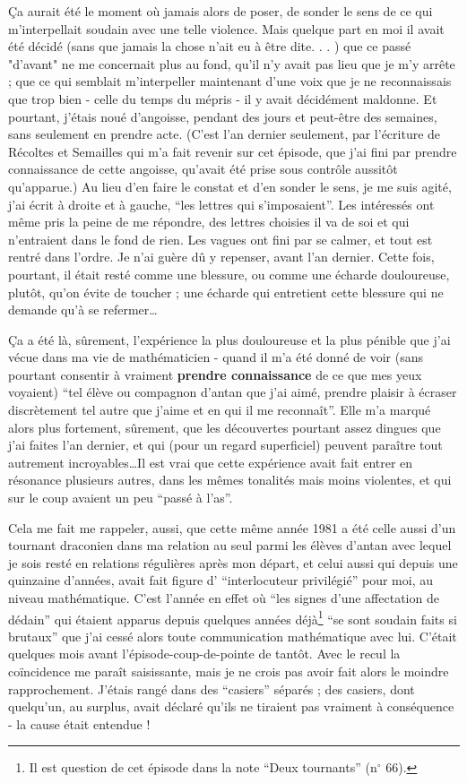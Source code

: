 Ça aurait été le moment où jamais alors de poser, de sonder le sens de ce qui m'interpellait soudain avec une telle violence. Mais quelque part en moi il avait été décidé (sans que jamais la chose n'ait eu à être dite. . . ) que ce passé "d'avant" ne me concernait plus au fond, qu'il n'y avait pas lieu que je m'y arrête ; que ce qui semblait m'interpeller maintenant d'une voix que je ne reconnaissais que trop bien - celle du temps du mépris - il y avait décidément maldonne. Et pourtant, j'étais noué d'angoisse, pendant des jours et peut-être des semaines, sans seulement en prendre acte. (C'est l'an dernier seulement, par l'écriture de Récoltes et Semailles qui m'a fait revenir sur cet épisode, que j'ai fini par prendre connaissance de cette angoisse, qu'avait été prise sous contrôle aussitôt qu'apparue.) Au lieu d'en faire le constat et d'en sonder le sens, je me suis agité, j'ai écrit à droite et à gauche, ``les lettres qui s'imposaient''. Les intéressés ont même pris la peine de me répondre, des lettres choisies il va de soi et qui n'entraient dans le fond de rien. Les vagues ont fini par se calmer, et tout est rentré dans l'ordre. Je n'ai guère dû y repenser, avant l'an dernier. Cette fois, pourtant, il était resté comme une blessure, ou comme une écharde douloureuse, plutôt, qu'on évite de toucher ; une écharde qui entretient cette blessure qui ne demande qu'à se refermer\ldots

Ça a été là, sûrement, l'expérience la plus douloureuse et la plus pénible que j'ai vécue dans ma vie de mathématicien - quand il m'a été donné de voir (sans pourtant consentir à vraiment \textbf{prendre connaissance} de ce que mes yeux voyaient) ``tel élève ou compagnon d'antan que j'ai aimé, prendre plaisir à écraser discrètement tel autre que j'aime et en qui il me reconnaît''. Elle m'a marqué alors plus fortement, sûrement, que les découvertes pourtant assez dingues que j'ai faites l'an dernier, et qui (pour un regard superficiel) peuvent paraître tout autrement incroyables\ldots Il est vrai que cette expérience avait fait entrer en résonance plusieurs autres, dans les mêmes tonalités mais moins violentes, et qui sur le coup avaient un peu ``passé à l'as''.

Cela me fait me rappeler, aussi, que cette même année 1981 a été celle aussi d'un tournant draconien dans ma relation au seul parmi les élèves d'antan avec lequel je sois resté en relations régulières après mon départ, et celui aussi qui depuis une quinzaine d'années, avait fait figure d' ``interlocuteur privilégié'' pour moi, au niveau mathématique. C'est l'année en effet où ``les signes d'une affectation de dédain'' qui étaient apparus depuis quelques années déjà\footnote{Il est question de cet épisode dans la note ``Deux tournants'' (n$^{\circ}$ 66).} ``se sont soudain faits si brutaux'' que j'ai cessé alors toute communication mathématique avec lui. C'était quelques mois avant l'épisode-coup-de-pointe de tantôt. Avec le recul la coïncidence me paraît saisissante, mais je ne crois pas avoir fait alors le moindre rapprochement. J'étais rangé dans des ``casiers'' séparés ; des casiers, dont quelqu'un, au surplus, avait déclaré qu'ils ne tiraient pas vraiment à conséquence - la cause était entendue !

